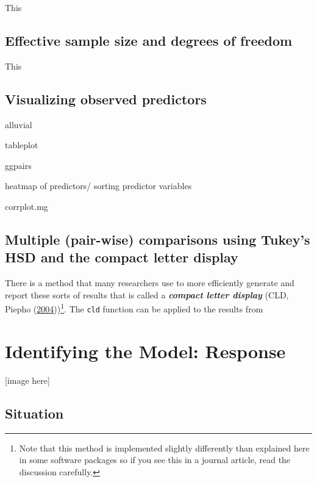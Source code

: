 \documentclass[
]{book}
\begin{document}
This

\hypertarget{section3-3}{%
\section{Effective sample size and degrees of freedom}\label{section3-3}}

This

\hypertarget{section3-4}{%
\section{Visualizing observed predictors}\label{section3-4}}

alluvial

tableplot

ggpairs

heatmap of predictors/ sorting predictor variables

corrplot.mg

\hypertarget{section3-5}{%
\section{Multiple (pair-wise) comparisons using Tukey's HSD and the compact letter display}\label{section3-5}}

\indent There is a method that many researchers use to more efficiently generate and
report these sorts of results that is called a \textbf{\emph{compact letter display}} 
(CLD, Piepho (\protect\hyperlink{ref-Piepho2004}{2004}))\footnote{Note that this method is implemented slightly differently than explained here in some software packages so if you see this in a journal article, read the discussion carefully.}. The \texttt{cld} function can be applied to the results from

\hypertarget{chapter4}{%
\chapter{Identifying the Model: Response}\label{chapter4}}

{[}image here{]}

\hypertarget{section4-1}{%
\section{Situation}\label{section4-1}}
\end{document}
